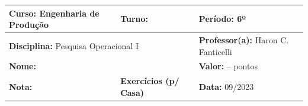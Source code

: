 \documentclass[a4paper,11pt]{article}
\newcommand{\professor}{Haron C. Fanticelli}
\newcommand{\disciplina}{Pesquisa Operacional I}
\newcommand{\trimestre}{6º}
\newcommand{\curso}{Engenharia de Produção}
\newcommand{\turno}{}
\newcommand{\instrumento}{Exercícios (p/ Casa)} %
\begin{document}
\doublespacing
\begin{center}
\begin{tabular}{|l|l|l|}
\hline
\textbf{Curso:} \curso & \textbf{Turno:} \turno & \textbf{Período:} \trimestre \\
\hline
\multicolumn{2}{|l|}{\textbf{Disciplina:} \disciplina} & \textbf{Professor(a):} \professor  \\
\hline
\multicolumn{2}{|l|}{\textbf{Nome:}} & \textbf{Valor:} -- pontos \\
\hline
\textbf{Nota:}  & \textbf{\instrumento} & \textbf{Data:} 09/2023  \\
\hline
\end{tabular}
\end{center}
\singlespacing


\vspace{-.2cm}
\end{document}
